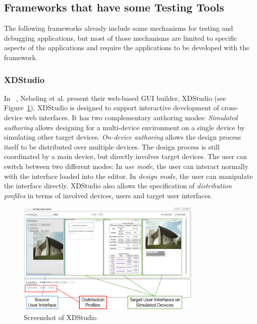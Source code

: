 \subsection{Frameworks that have some Testing Tools}

The following frameworks already include some mechanisms for testing and debugging applications, but most of those mechanisms are limited to specific aspects of the applications and require the applications to be developed with the framework.

\subsubsection{XDStudio}

In ~\cite{xdstudio2014}, Nebeling et al. present their web-based GUI builder, XDStudio (see Figure~\ref{fig:xdstudio}). XDStudio is designed to support interactive development of cross-device web interfaces. It has two complementary authoring modes: \emph{Simulated authoring} allows designing for a multi-device environment on a single device by simulating other target devices. \emph{On-device authoring} allows the design process itself to be distributed over multiple devices. The design process is still coordinated by a main device, but directly involves target devices. The user can switch between two different modes: In \emph{use mode}, the user can interact normally with the interface loaded into the editor. In \emph{design mode}, the user can manipulate the interface directly. XDStudio also allows the specification of \emph{distribution profiles} in terms of involved devices, users and target user interfaces.

\begin{figure}[H]
  \centering
    \includegraphics[width=0.8\textwidth]{images/relatedwork/xdstudio.png}
	\caption[Screenshot: XDStudio]{Screenshot of XDStudio}
	\label{fig:xdstudio}
\end{figure}

